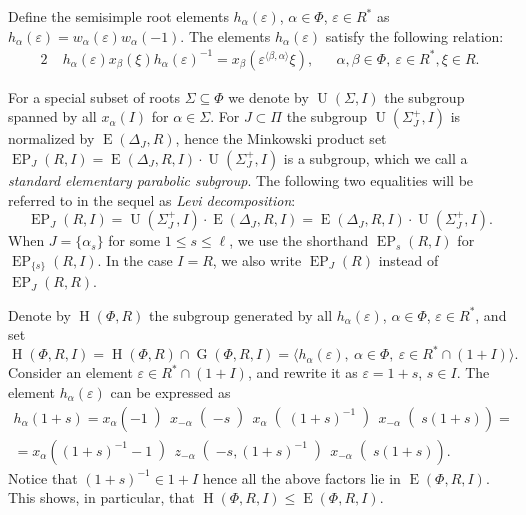 \documentclass[11pt]{amsart}
\theoremstyle{plain}
\numberwithin{equation}{section}
\numberwithin{lemma}{section}
\theoremstyle{definition}
\theoremstyle{remark}
\DeclareMathOperator{\G}{G}
\DeclareMathOperator{\E}{E}
\DeclareMathOperator{\EP}{EP}
\DeclareMathOperator{\Hh}{H}
\DeclareMathOperator{\U}{U}
\begin{document}
Define the semisimple root elements $h_\alpha(\varepsilon)$, $\alpha\in\Phi$, $\varepsilon\in R^*$ as $h_\alpha(\varepsilon)=w_\alpha(\varepsilon)w_\alpha(-1)$.
The elements $h_\alpha(\varepsilon)$ satisfy the following relation:
\begin{alignat}{2} 
& \phantom{[} h_\alpha(\varepsilon)x_\beta(\xi)h_\alpha(\varepsilon)^{-1} = x_\beta\left(\varepsilon^{\langle\beta, \alpha\rangle}\xi\right), && \alpha, \beta \in \Phi, \ \varepsilon \in R^*, \xi \in R. \label{rel:h-w}
\end{alignat}

For a special subset of roots $\Sigma\subseteq \Phi$ we denote by $\U(\Sigma, I)$ the subgroup spanned by all $x_{\alpha}(I)$ for $\alpha\in \Sigma$. 
For $J\subset\Pi$ the subgroup $\U(\Sigma_J^+, I)$ is normalized by $\E(\Delta_J, R)$, hence the Minkowski product set $\EP_J(R, I) = \E(\Delta_J, R, I) \cdot \U(\Sigma_J^+, I)$ is a subgroup, which we call a \emph{standard elementary parabolic subgroup}.
The following two equalities will be referred to in the sequel as \emph{Levi decomposition}:
\begin{equation} \label{rel:Levi-decomp} \EP_J(R, I) = \U(\Sigma_J^+, I) \cdot \E(\Delta_J, R, I) = \E(\Delta_J, R, I) \cdot \U(\Sigma_J^+, I). \end{equation}
When $J = \{ \alpha_s \}$ for some $1 \leq s\leq \ell$, we use the shorthand $\EP_s(R, I)$ for $\EP_{\{s\}}(R, I)$.
In the case $I=R$, we also write $\EP_J(R)$ instead of $\EP_J(R, R)$.

Denote by $\Hh(\Phi, R)$ the subgroup generated by all $h_\alpha(\varepsilon)$, $\alpha\in\Phi$, $\varepsilon\in R^*$, and set
\[ \Hh(\Phi, R, I) = \Hh(\Phi, R)\cap\G(\Phi, R, I)=\langle h_\alpha(\varepsilon), \ \alpha\in\Phi, \ \varepsilon\in R^*\cap(1+I)\rangle. \]
Consider an element $\varepsilon\in R^*\cap(1+I)$, and rewrite it as $\varepsilon=1+s$, $s\in I$. The element $h_\alpha(\varepsilon)$ can be expressed as
\begin{multline} \label{eq:rel-tor-elementary}
h_\alpha(1+s) = x_\alpha\left(-1\middle)\, x_{-\alpha}\middle(-s\middle)\, x_\alpha\middle((1+s)^{-1}\middle)\, x_{-\alpha}\middle(s(1+s)\right) = \\
= x_\alpha\left((1+s)^{-1}-1\middle)\, z_{-\alpha}\middle(-s, (1+s)^{-1}\middle)\, x_{-\alpha}\middle(s(1+s)\right).
\end{multline}
Notice that $(1+s)^{-1}\in 1+I$ hence all the above factors lie in $\E(\Phi, R, I)$. 
 This shows, in particular, that $\Hh(\Phi, R, I) \leqslant \E(\Phi, R, I)$.
\end{document}
